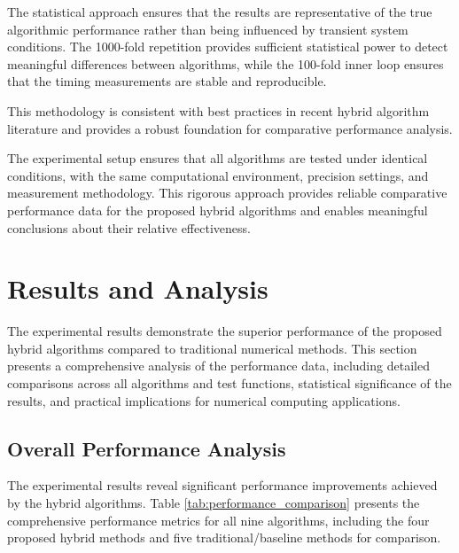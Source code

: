 \documentclass[amsmath, amssymb, aps]{revtex4-2}
\begin{document}
The statistical approach ensures that the results are representative of the true algorithmic performance rather than being influenced by transient system conditions. The 1000-fold repetition provides sufficient statistical power to detect meaningful differences between algorithms, while the 100-fold inner loop ensures that the timing measurements are stable and reproducible.

This methodology is consistent with best practices in recent hybrid algorithm literature \cite{sabharwal2019blended, badr2022novel} and provides a robust foundation for comparative performance analysis.

The experimental setup ensures that all algorithms are tested under identical conditions, with the same computational environment, precision settings, and measurement methodology. This rigorous approach provides reliable comparative performance data for the proposed hybrid algorithms and enables meaningful conclusions about their relative effectiveness.

\section{Results and Analysis}

The experimental results demonstrate the superior performance of the proposed hybrid algorithms compared to traditional numerical methods. This section presents a comprehensive analysis of the performance data, including detailed comparisons across all algorithms and test functions, statistical significance of the results, and practical implications for numerical computing applications.

\subsection{Overall Performance Analysis}

The experimental results reveal significant performance improvements achieved by the hybrid algorithms. Table \ref{tab:performance_comparison} presents the comprehensive performance metrics for all nine algorithms, including the four proposed hybrid methods and five traditional/baseline methods for comparison.
\end{document}
